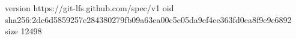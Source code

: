 version https://git-lfs.github.com/spec/v1
oid sha256:2dc6d5859257e284380279fb09a63ea00c5e05da9ef4ee363fd0ea8f9e9e6892
size 12498

